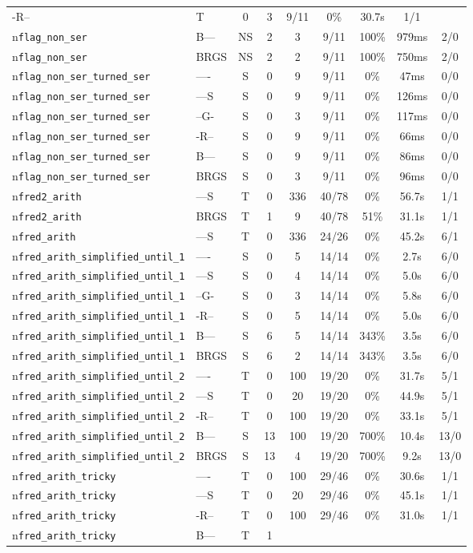 \begin{tabular}{llccccccc}
-R-- & T & 0 & 3 & 9/11 & 0\% & 30.7s & 1/1 \\n\texttt{flag\_non\_ser} & B--- & NS & 2 & 3 & 9/11 & 100\% & 979ms & 2/0 \\n\texttt{flag\_non\_ser} & BRGS & NS & 2 & 2 & 9/11 & 100\% & 750ms & 2/0 \\n\texttt{flag\_non\_ser\_turned\_ser} & ---- & S & 0 & 9 & 9/11 & 0\% & 47ms & 0/0 \\n\texttt{flag\_non\_ser\_turned\_ser} & ---S & S & 0 & 9 & 9/11 & 0\% & 126ms & 0/0 \\n\texttt{flag\_non\_ser\_turned\_ser} & --G- & S & 0 & 3 & 9/11 & 0\% & 117ms & 0/0 \\n\texttt{flag\_non\_ser\_turned\_ser} & -R-- & S & 0 & 9 & 9/11 & 0\% & 66ms & 0/0 \\n\texttt{flag\_non\_ser\_turned\_ser} & B--- & S & 0 & 9 & 9/11 & 0\% & 86ms & 0/0 \\n\texttt{flag\_non\_ser\_turned\_ser} & BRGS & S & 0 & 3 & 9/11 & 0\% & 96ms & 0/0 \\n\texttt{fred2\_arith} & ---S & T & 0 & 336 & 40/78 & 0\% & 56.7s & 1/1 \\n\texttt{fred2\_arith} & BRGS & T & 1 & 9 & 40/78 & 51\% & 31.1s & 1/1 \\n\texttt{fred\_arith} & ---S & T & 0 & 336 & 24/26 & 0\% & 45.2s & 6/1 \\n\texttt{fred\_arith\_simplified\_until\_1} & ---- & S & 0 & 5 & 14/14 & 0\% & 2.7s & 6/0 \\n\texttt{fred\_arith\_simplified\_until\_1} & ---S & S & 0 & 4 & 14/14 & 0\% & 5.0s & 6/0 \\n\texttt{fred\_arith\_simplified\_until\_1} & --G- & S & 0 & 3 & 14/14 & 0\% & 5.8s & 6/0 \\n\texttt{fred\_arith\_simplified\_until\_1} & -R-- & S & 0 & 5 & 14/14 & 0\% & 5.0s & 6/0 \\n\texttt{fred\_arith\_simplified\_until\_1} & B--- & S & 6 & 5 & 14/14 & 343\% & 3.5s & 6/0 \\n\texttt{fred\_arith\_simplified\_until\_1} & BRGS & S & 6 & 2 & 14/14 & 343\% & 3.5s & 6/0 \\n\texttt{fred\_arith\_simplified\_until\_2} & ---- & T & 0 & 100 & 19/20 & 0\% & 31.7s & 5/1 \\n\texttt{fred\_arith\_simplified\_until\_2} & ---S & T & 0 & 20 & 19/20 & 0\% & 44.9s & 5/1 \\n\texttt{fred\_arith\_simplified\_until\_2} & -R-- & T & 0 & 100 & 19/20 & 0\% & 33.1s & 5/1 \\n\texttt{fred\_arith\_simplified\_until\_2} & B--- & S & 13 & 100 & 19/20 & 700\% & 10.4s & 13/0 \\n\texttt{fred\_arith\_simplified\_until\_2} & BRGS & S & 13 & 4 & 19/20 & 700\% & 9.2s & 13/0 \\n\texttt{fred\_arith\_tricky} & ---- & T & 0 & 100 & 29/46 & 0\% & 30.6s & 1/1 \\n\texttt{fred\_arith\_tricky} & ---S & T & 0 & 20 & 29/46 & 0\% & 45.1s & 1/1 \\n\texttt{fred\_arith\_tricky} & -R-- & T & 0 & 100 & 29/46 & 0\% & 31.0s & 1/1 \\n\texttt{fred\_arith\_tricky} & B--- & T & 1 & 
\end{tabular}
